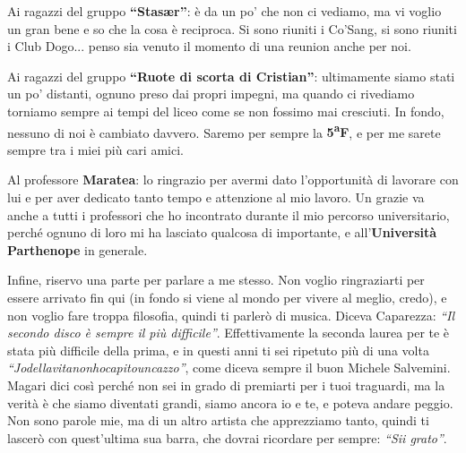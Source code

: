 Ai ragazzi del gruppo \textbf{“Stas\ae r”}: è da un po' che non ci vediamo, ma vi voglio un gran bene e so che la cosa è reciproca. Si sono riuniti i Co'Sang, si sono riuniti i Club Dogo... penso sia venuto il momento di una reunion anche per noi.

Ai ragazzi del gruppo \textbf{“Ruote di scorta di Cristian”}: ultimamente siamo stati un po' distanti, ognuno preso dai propri impegni, ma quando ci rivediamo torniamo sempre ai tempi del liceo come se non fossimo mai cresciuti. In fondo, nessuno di noi è cambiato davvero. Saremo per sempre la \textbf{5\textsuperscript{a}F}, e per me sarete sempre tra i miei più cari amici.

Al professore \textbf{Maratea}: lo ringrazio per avermi dato l'opportunità di lavorare con lui e per aver dedicato tanto tempo e attenzione al mio lavoro. Un grazie va anche a tutti i professori che ho incontrato durante il mio percorso universitario, perché ognuno di loro mi ha lasciato qualcosa di importante, e all'\textbf{Università Parthenope} in generale.

Infine, riservo una parte per parlare a me stesso. Non voglio ringraziarti per essere arrivato fin qui (in fondo si viene al mondo per vivere al meglio, credo), e non voglio fare troppa filosofia, quindi ti parlerò di musica. Diceva Caparezza: \textit{“Il secondo disco è sempre il più difficile”}. Effettivamente la seconda laurea per te è stata più difficile della prima, e in questi anni ti sei ripetuto più di una volta \textit{“Jodellavitanonhocapitouncazzo”}, come diceva sempre il buon Michele Salvemini. Magari dici così perché non sei in grado di premiarti per i tuoi traguardi, ma la verità è che siamo diventati grandi, siamo ancora io e te, e poteva andare peggio. Non sono parole mie, ma di un altro artista che apprezziamo tanto, quindi ti lascerò con quest'ultima sua barra, che dovrai ricordare per sempre: \textit{“Sii grato”}.